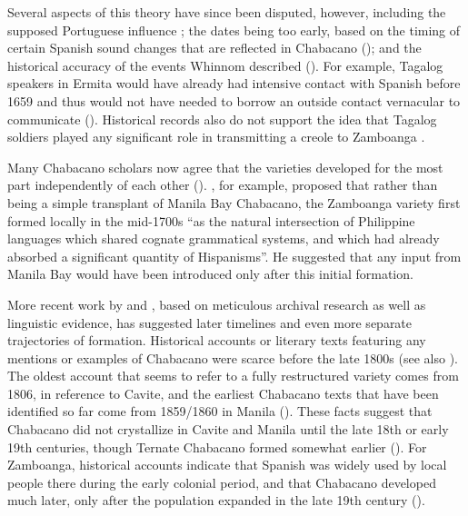 \documentclass[output=paper,colorlinks,citecolor=brown]{langscibook}
\begin{document}
Several aspects of this theory have since been disputed, however, including the supposed Portuguese influence \citep{Lipski1988}; the dates being too early, based on the timing of certain Spanish sound changes that are reflected in Chabacano (\citealt{FernándezSippola2017}); and the historical accuracy of the events Whinnom described (\citealt{Fernández2006,Fernández2011,Fernández2012leyenda,Fernández2012elchab,Fernández2019}). For example, Tagalog speakers in Ermita would have already had intensive contact with Spanish before 1659 and thus would not have needed to borrow an outside contact vernacular to communicate (\citealt{Fernández2011,Fernández2012leyenda}). Historical records also do not support the idea that Tagalog soldiers played any significant role in transmitting a creole to Zamboanga \citep{Fernández2019}. 

Many Chabacano scholars now agree that the varieties developed for the most part independently of each other (\citealt{Lipski1992,Fernández2011,Fernández2012leyenda,Fernández2012elchab,FernándezSippola2017,SippolaLesho2020}). \citet[12]{Lipski1992}, for example, proposed that rather than being a simple transplant of Manila Bay Chabacano, the Zamboanga variety first formed locally in the mid-1700s “as the natural intersection of Philippine languages which shared cognate grammatical systems, and which had already absorbed a significant quantity of Hispanisms”. He suggested that any input from Manila Bay would have been introduced only after this initial formation.

More recent work by \citet{Fernández2006,Fernández2011,Fernández2012leyenda,Fernández2012elchab,Fernández2019} and \citet{FernándezSippola2017}, based on meticulous archival research as well as linguistic evidence, has suggested later timelines and even more separate trajectories of formation. Historical accounts or literary texts featuring any mentions or examples of Chabacano were scarce before the late 1800s (see also \citealt{Lipski2013}). The oldest account that seems to refer to a fully restructured variety comes from 1806, in reference to Cavite, and the earliest Chabacano texts that have been identified so far come from 1859/1860 in Manila (\citealt{FernándezSippola2017}). These facts suggest that Chabacano did not crystallize in Cavite and Manila until the late 18th or early 19th centuries, though Ternate Chabacano formed somewhat earlier (\citealt{FernándezSippola2017}). For Zamboanga, historical accounts indicate that Spanish was widely used by local people there during the early colonial period, and that Chabacano developed much later, only after the population expanded in the late 19th century (\citealt{Fernández2006, Fernández2012elchab}). 
\end{document}

